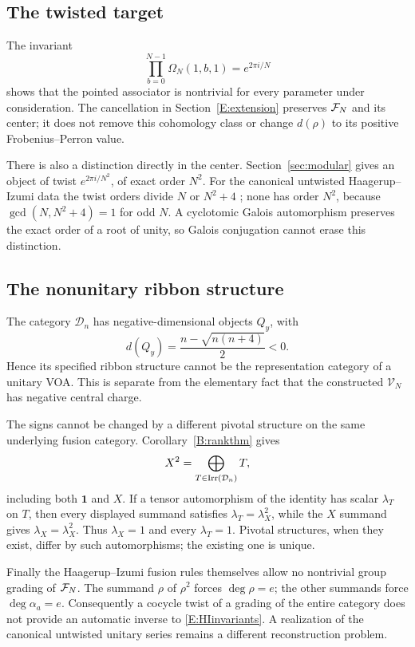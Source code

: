 \documentclass[11pt]{article}
\newcommand{\one}{\mathbf1}\newcommand{\D}{\mathcal D}\newcommand{\Dcat}{\mathcal D}
\numberwithin{equation}{section}
\begin{document}
\subsection{The twisted target}
The invariant
\[
\prod_{b=0}^{N-1}\Omega_N(1,b,1)=e^{2\pi i/N}
\]
shows that the pointed associator is nontrivial for every parameter under consideration. The cancellation in Section~\ref{E:extension} preserves $\mathcal F_N$ and its center; it does not remove this cohomology class or change $d(\rho)$ to its positive Frobenius--Perron value.

There is also a distinction directly in the center. Section~\ref{sec:modular} gives an object of twist $e^{2\pi i/N^2}$, of exact order $N^2$. For the canonical untwisted Haagerup--Izumi data the twist orders divide $N$ or $N^2+4$ \cite[Section~3.2]{B:EG11}; none has order $N^2$, because $\gcd(N,N^2+4)=1$ for odd $N$. A cyclotomic Galois automorphism preserves the exact order of a root of unity, so Galois conjugation cannot erase this distinction.

\subsection{The nonunitary ribbon structure}
The category $\D_n$ has negative-dimensional objects $Q_y$, with
\[
d(Q_y)=\frac{n-\sqrt{n(n+4)}}2<0.
\]
Hence its specified ribbon structure cannot be the representation category of a unitary VOA. This is separate from the elementary fact that the constructed $\mathscr{V}_N$ has negative central charge.

The signs cannot be changed by a different pivotal structure on the same underlying fusion category. Corollary~\ref{B:rankthm} gives
\[
X^2=\bigoplus_{T\in\Irr(\D_n)}T,
\]
including both $\one$ and $X$. If a tensor automorphism of the identity has scalar $\lambda_T$ on $T$, then every displayed summand satisfies $\lambda_T=\lambda_X^2$, while the $X$ summand gives $\lambda_X=\lambda_X^2$. Thus $\lambda_X=1$ and every $\lambda_T=1$. Pivotal structures, when they exist, differ by such automorphisms; the existing one is unique.

Finally the Haagerup--Izumi fusion rules themselves allow no nontrivial group grading of $\mathcal F_N$. The summand $\rho$ of $\rho^2$ forces $\deg\rho=e$; the other summands force $\deg\alpha_a=e$. Consequently a cocycle twist of a grading of the entire category does not provide an automatic inverse to \eqref{E:HIinvariants}. A realization of the canonical untwisted unitary series remains a different reconstruction problem.
\end{document}

